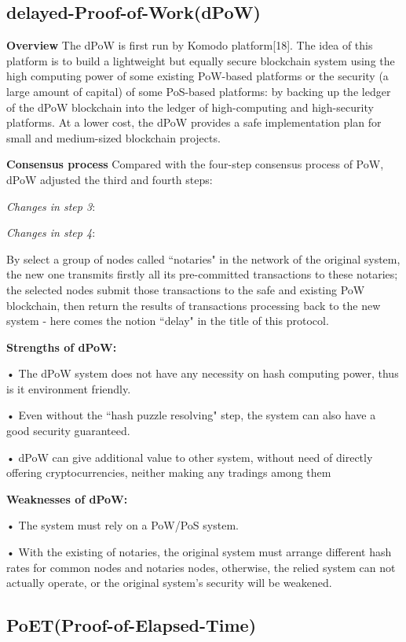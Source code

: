 \documentclass[doublespacing]{bmcart}
\begin{document}
\begin{CJK*}{UTF8}{gbsn}
    \subsection{\textbf{delayed-Proof-of-Work(dPoW)}}
    \textbf{Overview}	
	 The dPoW is first run by Komodo platform[18]. The idea of this platform is to build a lightweight but equally secure blockchain system using the high computing power of some existing PoW-based platforms or the security (a large amount of capital) of some PoS-based platforms: by backing up the ledger of the dPoW blockchain into the ledger of high-computing and high-security platforms. At a lower cost, the dPoW provides a safe implementation plan for small and medium-sized blockchain projects.
    \par \textbf{Consensus process}
    Compared with the four-step consensus process of PoW, dPoW adjusted the third and fourth steps:
    \par\textsl{Changes in step 3}: 
    \par\textsl{Changes in step 4}:
	\par By select a group of nodes called ``notaries" in the network of the original system, the new one transmits firstly all its pre-committed transactions to these notaries;	the selected nodes submit those transactions to the safe and existing PoW blockchain, then return the results of transactions processing back to the new system - here comes the notion ``delay" in the title of this protocol.
	\par\textbf{Strengths of dPoW:}		
    \par• The dPoW system does not have any necessity on hash computing power, thus is it environment friendly.
    \par • Even without the ``hash puzzle resolving" step, the system can also have a good security guaranteed.
    \par • dPoW can give additional value to other system, without need of directly offering cryptocurrencies, neither making any tradings among them
	\par\textbf{Weaknesses of dPoW:}	
    \par • The system must rely on a PoW/PoS system.
    \par • With the existing of notaries, the original system must arrange different hash rates for common nodes and notaries nodes, otherwise, the relied system can not actually operate, or the original system’s security will be weakened.
    
    \subsection{ PoET(Proof-of-Elapsed-Time)} 

\end{CJK*}
\end{document}
